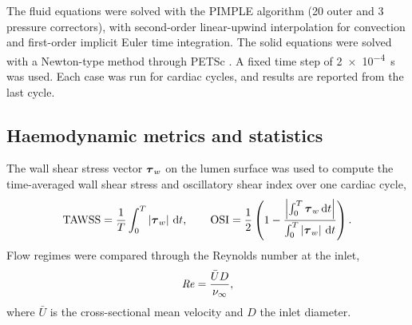 The fluid equations were solved with the PIMPLE algorithm (20 outer and 3 pressure correctors), with second-order linear-upwind interpolation for convection and first-order implicit Euler time integration.
The solid equations were solved with a Newton-type method through PETSc \citep{balay2024petsc}.
A fixed time step of \SI{2e-4}{\second} was used.
Each case was run for  cardiac cycles, and results are reported from the last cycle.

\subsection{Haemodynamic metrics and statistics}\label{sec:metrics}

The wall shear stress vector $\boldsymbol{\tau}_w$ on the lumen surface was used to compute the time-averaged wall shear stress and oscillatory shear index over one cardiac cycle,
\begin{equation}
  \mathrm{TAWSS} = \frac{1}{T}\int_0^T \left|\boldsymbol{\tau}_w\right| \,\mathrm{d}t,
  \qquad
  \mathrm{OSI} = \frac12 \left( 1 - \frac{\left|\int_0^T \boldsymbol{\tau}_w \,\mathrm{d}t\right|}{\int_0^T \left|\boldsymbol{\tau}_w\right| \,\mathrm{d}t} \right).
  \label{eq:tawss-osi}
\end{equation}
Flow regimes were compared through the Reynolds number at the inlet,
\begin{equation}
  \mathit{Re} = \frac{\bar{U} D}{\nu_\infty},
  \label{eq:re}
\end{equation}
where $\bar{U}$ is the cross-sectional mean velocity and $D$ the inlet diameter.
